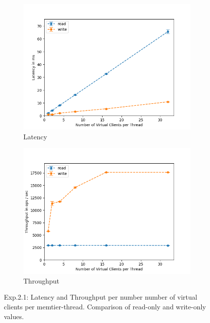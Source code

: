 \documentclass[11pt,a4paper]{article}
\begin{document}
\begin{figure}[H]
\centering
\begin{subfigure}{.5\textwidth}
    \centering
    \includegraphics[width=\textwidth]{img/exp2_1/exp2_1__latency_client_read_write.png}
    \caption{Latency}
    \label{fig:mesh1}
\end{subfigure}%
\begin{subfigure}{.5\textwidth}
      \centering
    \includegraphics[width=\textwidth]{img/exp2_1/exp2_1__throughput_client_read_write.png}
    \caption{Throughput}
    \label{fig:mesh1}
\end{subfigure}
\caption{Exp.2.1: Latency and Throughput per number number of virtual clients per memtier-thread. Comparison of read-only and write-only values.}
\label{fig:test}
\end{figure}
\end{document}
